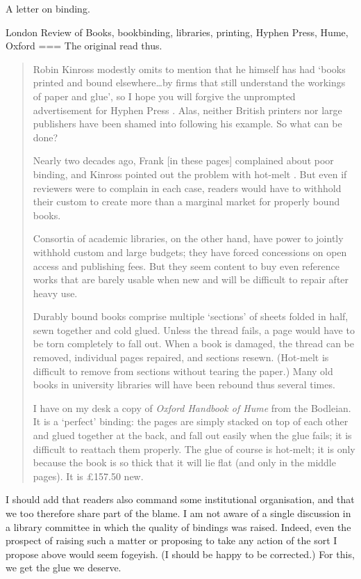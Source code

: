 A letter on binding.

London Review of Books, bookbinding, libraries, printing, Hyphen Press, Hume, Oxford
===
The original read thus.
\begin{quote}
    Robin Kinross modestly omits to mention that he himself has had ‘books printed and bound elsewhere…by firms that still understand the workings of paper and glue’, so I hope you will forgive the unprompted advertisement for Hyphen Press \parencite{2024i}. Alas, neither British printers nor large publishers have been shamed into following his example. So what can be done?

    Nearly two decades ago, Frank \textcite{kermode2007} [in these pages] complained about poor binding, and Kinross pointed out the problem with hot-melt \parencite{2007a}. But even if reviewers were to complain in each case, readers would have to withhold their custom to create more than a marginal market for properly bound books.

    Consortia of academic libraries, on the other hand, have power to jointly withhold custom and large budgets; they have forced concessions on open access and publishing fees. But they seem content to buy even reference works that are barely usable when new and will be difficult to repair after heavy use.

    Durably bound books comprise multiple ‘sections’ of sheets folded in half, sewn together and cold glued. Unless the thread fails, a page would have to be torn completely to fall out. When a book is damaged, the thread can be removed, individual pages repaired, and sections resewn. (Hot-melt is difficult to remove from sections without tearing the paper.) Many old books in university libraries will have been rebound thus several times.

    I have on my desk a copy of \emph{Oxford Handbook of Hume} from the Bodleian. It is a ‘perfect’ binding: the pages are simply stacked on top of each other and glued together at the back, and fall out easily when the glue fails; it is difficult to reattach them properly. The glue of course is hot-melt; it is only because the book is so thick that it will lie flat (and only in the middle pages). It is £157.50 new.
\end{quote}

I should add that readers also command some institutional organisation, and that we too therefore share part of the blame. I am not aware of a single discussion in a library committee in which the quality of bindings was raised. Indeed, even the prospect of raising such a matter or proposing to take any action of the sort I propose above would seem fogeyish. (I should be happy to be corrected.) For this, we get the glue we deserve.

\nocite{2024h}